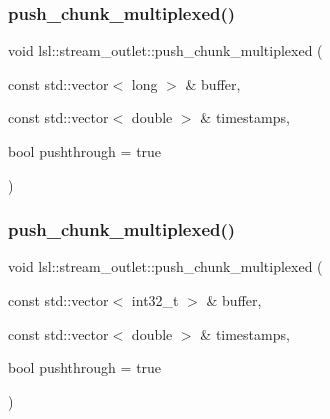 \subsubsection{\texorpdfstring{push\+\_\+chunk\+\_\+multiplexed()}{push\_chunk\_multiplexed()}\hspace{0.1cm}{\footnotesize\ttfamily [10/28]}}
{\footnotesize\ttfamily void lsl\+::stream\+\_\+outlet\+::push\+\_\+chunk\+\_\+multiplexed (\begin{DoxyParamCaption}\item[{const std\+::vector$<$ long $>$ \&}]{buffer,  }\item[{const std\+::vector$<$ double $>$ \&}]{timestamps,  }\item[{bool}]{pushthrough = {\ttfamily true} }\end{DoxyParamCaption})\hspace{0.3cm}{\ttfamily [inline]}}

\mbox{\label{classlsl_1_1stream__outlet_ae3875c13d689e11c6d34181b8fadfa5d}} 
\subsubsection{\texorpdfstring{push\+\_\+chunk\+\_\+multiplexed()}{push\_chunk\_multiplexed()}\hspace{0.1cm}{\footnotesize\ttfamily [11/28]}}
{\footnotesize\ttfamily void lsl\+::stream\+\_\+outlet\+::push\+\_\+chunk\+\_\+multiplexed (\begin{DoxyParamCaption}\item[{const std\+::vector$<$ int32\+\_\+t $>$ \&}]{buffer,  }\item[{const std\+::vector$<$ double $>$ \&}]{timestamps,  }\item[{bool}]{pushthrough = {\ttfamily true} }\end{DoxyParamCaption})\hspace{0.3cm}{\ttfamily [inline]}}

\mbox{\label{classlsl_1_1stream__outlet_a9d175090070f408ca7e9c8d8437c02f6}} 
